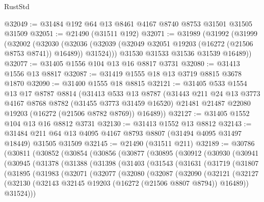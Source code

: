 \begin{lexlean}{RustStd}
\begin{coremodule}
@32049 := @31484 @192 @64 @13 @8461 @4167 @8740 @8753 @31501 @31505 @31509
@32051 := @21490 (@31511 @192)
@32071 := @31989
    (@31992
      (@31999
        (@32002
          (@32030
            (@32036 (@32039 (@32049 @32051 @19203 (@16272 (@21506 @8753 @8741)) @16489)) @31524)))
        @31530
        @31533
        @31536
        @31539
        @16489))
@32077 := @31405 @1556 @104 @13 @16 @8817 @3731
@32080 := @31413 @1556 @13 @8817
@32087 := @31419 @1555 @18 @13 @3719 @8815 @3678 @1870
@32090 := @31400 @1555 @18 @8815
@32121 := @31405
    @533
    @1554
    @13
    @17
    @8787
    @8814
    (@31413
      @533
      @13
      @8787
      (@31443
        @211
        @24
        @13
        @3773
        @4167
        @8768
        @8782
        (@31455 @3773 @31459 @16520)
        @21481
        @21487
        @22080
        @19203
        (@16272 (@21506 @8782 @8769))
        @16489))
@32127 := @31405 @1552 @104 @13 @16 @8812 @3731
@32130 := @31413 @1552 @13 @8812
@32143 := @31484 @211 @64 @13 @4095 @4167 @8793 @8807 (@31494 @4095 @31497 @18449) @31505 @31509
@32145 := @21490 (@31511 @211)
@32189 := @30786
    (@30811
      (@30852
        (@30854
          (@30856
            (@30877
              (@30895
                (@30912
                  (@30930
                    (@30941
                      (@30945
                        (@31378
                          (@31388
                            (@31398
                              (@31403
                                (@31543
                                  (@31631
                                    (@31719
                                      (@31807
                                        (@31895
                                          (@31983
                                            (@32071
                                              (@32077
                                                (@32080
                                                  (@32087
                                                    (@32090
                                                      (@32121
                                                        (@32127
                                                          (@32130
                                                            (@32143
                                                              @32145
                                                              @19203
                                                              (@16272 (@21506 @8807 @8794))
                                                              @16489))
                                                          @31524)))

\end{coremodule}
\end{lexlean}
